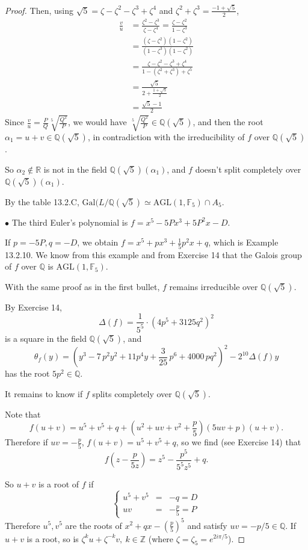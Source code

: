 \documentclass[11pt,a4paper]{article}
\newcommand{\Q}{\mathbb{Q}}
\newcommand{\Z}{\mathbb{Z}}
\newcommand{\R}{\mathbb{R}}
\newcommand{\F}{\mathbb{F}}
\newcommand{\Gal}{\mathrm{Gal}}
\begin{document}
\begin{proof}
Then, using $\sqrt{5} = \zeta - \zeta^2 - \zeta^3 + \zeta^4$ and $\zeta^2 + \zeta^3 = \frac{-1 + \sqrt{5}}{2}$,
\begin{align*}
\frac{v}{u} &= \frac{\zeta^2 - \zeta^3}{\zeta - \zeta^4} = \frac{\zeta - \zeta^2}{1 - \zeta^3}\\
&=\frac{(\zeta - \zeta^2)(1 - \zeta^2)}{(1 - \zeta^3)(1-\zeta^2)}\\
&= \frac{\zeta - \zeta^2 - \zeta^3 + \zeta^4}{1 - (\zeta^2+\zeta^3) + \zeta^5}\\
&= \frac{\sqrt{5}}{2 +\frac{1+\sqrt{5}}{2}}\\
&= \frac{\sqrt{5}-1}{2}
\end{align*}
Since  $\frac{v}{u} = \frac{P}{Q} \sqrt[5]{\frac{Q^2}{P}} $, we would have $\sqrt[5]{\frac{Q^2}{P}} \in \Q(\sqrt{5})$, and then the root $\alpha_1 = u + v\in \Q(\sqrt{5})$, in contradiction with the irreducibility of $f$ over $\Q(\sqrt{5})$.

So $\alpha_2 \not \in \R$ is not in the field $\Q(\sqrt{5})(\alpha_1)$, and $f$ doesn't split completely over $\Q(\sqrt{5})(\alpha_1)$.

By the table 13.2.C, $\Gal(L/\Q(\sqrt{5}) \simeq \mathrm{AGL}(1,\F_5)\cap A_5$.

 \item[$\bullet$] The third Euler's polynomial is $f = x^5 - 5Px^3 + 5P^2 x - D$.
   
   If $p = -5P,q = -D$, we obtain $f = x^5+ p x^3 +\frac{1}{5} p^2x +q$, which is Example 13.2.10. We know from this example and from Exercise 14 that the Galois group of $f$ over $\Q$ is $\mathrm{AGL}(1,\F_5)$.
  
With the same proof as in the first bullet, $f$ remains irreducible over $\Q(\sqrt{5})$.
 
 By Exercise 14,
 $$
\Delta(f) =\frac{1}{5^5} \cdot (4 p^{5} + 3125 q^{2})^{2}
$$
is a square in the field $\Q(\sqrt{5})$, and 
$$\theta_f(y) = \left(y^3-7 \, p^{2}y^2+11 p^{4}y+\frac{3}{25} \, p^{6} + 4000 \, p q^{2}\right)^2 - 2^{10}\Delta(f) y
$$
has the root $5p^2 \in \Q$.

It remains to know if $f$ splits completely over $\Q(\sqrt{5})$.

   Note that
   $$f(u+v) = u^5 + v^5 + q + (u^2 + uv + v^2 +\frac{p}{5})(5 uv +p)(u+v).$$
   Therefore if $uv = -\frac{p}{5}$, $f(u + v) = u^5 +v^5 +q$, so we find (see Exercise 14) that
   $$f\left(z - \frac{p}{5z}\right) = z^5 - \frac{p^5}{5^5 z^5} + q.$$
  
   So $u+v$ is a root of $f$ if 
   $$
\left\{
\begin{array}{rcc}
  u^5 + v^5 &   = & -q  = D \\
  uv &   = &  -\frac{p}{5}  =P 
\end{array}
\right.
   $$
   Therefore $u^5, v^5$ are the roots of $x^2 + qx -(\frac{p}{5})^5$ and satisfy $uv = -p/5 \in \Q$. If $u+v$ is a root, so is $\zeta^k u + \zeta^{-k} v, \ k \in \Z$ (where $\zeta = \zeta_5 = e^{2i\pi/5}$).
  

\end{proof}
\end{document}
